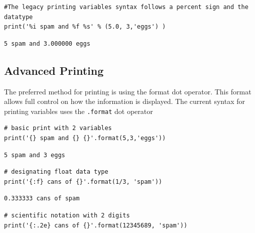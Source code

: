 \documentclass[%
oneside,                 %
final,                   %
10pt]{article}
\begin{document}
\begin{verbatim}
#The legacy printing variables syntax follows a percent sign and the datatype
print('%i spam and %f %s' % (5.0, 3,'eggs') )
\end{verbatim}

\begin{verbatim}
5 spam and 3.000000 eggs
\end{verbatim}

\subsection{Advanced Printing}

The preferred method for printing is using the format dot operator. This format allows full control on how the information is displayed. The current syntax for printing variables uses the \texttt{.format} dot operator


\begin{verbatim}
# basic print with 2 variables
print('{} spam and {} {}'.format(5,3,'eggs'))
\end{verbatim}

\begin{verbatim}
5 spam and 3 eggs
\end{verbatim}


\begin{verbatim}
# designating float data type
print('{:f} cans of {}'.format(1/3, 'spam'))
\end{verbatim}

\begin{verbatim}
0.333333 cans of spam
\end{verbatim}


\begin{verbatim}
# scientific notation with 2 digits
print('{:.2e} cans of {}'.format(12345689, 'spam'))
\end{verbatim}
\end{document}
